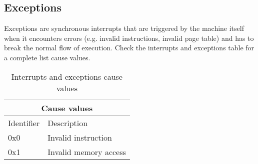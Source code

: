 \documentclass{article}
\begin{document}
\subsection{Exceptions}
Exceptions are synchronous interrupts that are triggered by the machine itself when it encounters errors (e.g. invalid instructions, invalid page table) and has to break the normal flow of execution. Check the interrupts and exceptions table for a complete list cause values.
\\

\begin{table}[h!]
\centering
\begin{tabular} { | p{6cm} | p{6cm} |}
  \hline
  \multicolumn{2}{|c|}{Cause values}\\
  \hline
  Identifier & Description\\
  \hline  
  0x0 & Invalid instruction\\
  0x1 & Invalid memory access \\
  
  \hline
  
\end{tabular}
\caption{Interrupts and exceptions cause values}
\end{table}
\end{document}
